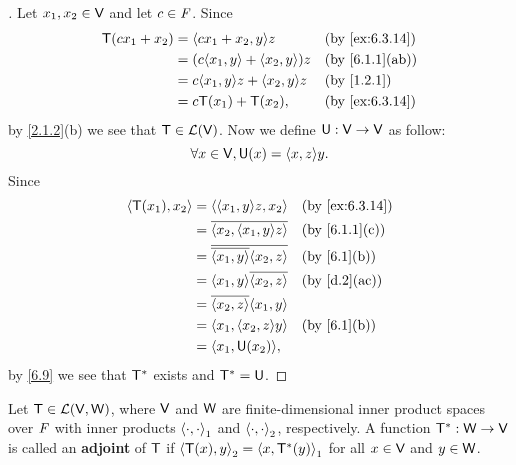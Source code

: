 \begin{proof}[]
	Let \(x_1, x_2 \in \mathsf{V}\) and let \(c \in \mathit{F}\).
	Since
	\begin{align*}
		\T(c x_1 + x_2) & = \inn{c x_1 + x_2, y} z            &  & \by{ex:6.3.14} \\
		                & = (c \inn{x_1, y} + \inn{x_2, y}) z &  & \by{6.1.1}[ab] \\
		                & = c \inn{x_1, y} z + \inn{x_2, y} z &  & \by{1.2.1}     \\
		                & = c \T(x_1) + \T(x_2),              &  & \by{ex:6.3.14}
	\end{align*}
	by \cref{2.1.2}(b) we see that \(\mathsf{T} \in \mathcal{L}(\mathsf{V})\).
	Now we define \(\mathsf{U} : \mathsf{V} \to \mathsf{V}\) as follow:
	\[
		\forall x \in \V, \U(x) = \inn{x, z} y.
	\]
	Since
	\begin{align*}
		\inn{\T(x_1), x_2} & = \inn{\inn{x_1, y} z, x_2}               &  & \by{ex:6.3.14} \\
		                   & = \conj{\inn{x_2, \inn{x_1, y} z}}        &  & \by{6.1.1}[c]  \\
		                   & = \conj{\conj{\inn{x_1, y}} \inn{x_2, z}} &  & \by{6.1}[b]    \\
		                   & = \inn{x_1, y} \conj{\inn{x_2, z}}        &  & \by{d.2}[ac]   \\
		                   & = \conj{\inn{x_2, z}} \inn{x_1, y}                            \\
		                   & = \inn{x_1, \inn{x_2, z} y}               &  & \by{6.1}[b]    \\
		                   & = \inn{x_1, \U(x_2)},
	\end{align*}
	by \cref{6.9} we see that \(\mathsf{T}^*\) exists and \(\mathsf{T}^* = \mathsf{U}\).
\end{proof}

\begin{defn}\label{6.3.8}
	Let \(\mathsf{T} \in \mathcal{L}(\mathsf{V}, \mathsf{W})\), where \(\mathsf{V}\) and \(\mathsf{W}\) are finite-dimensional inner product spaces over \(\mathit{F}\) with inner products \(\left\langle\cdot, \cdot\right\rangle_1\) and \(\left\langle\cdot, \cdot\right\rangle_2\), respectively.
	A function \(\mathsf{T}^* : \mathsf{W} \to \mathsf{V}\) is called an \textbf{adjoint} of \(\mathsf{T}\) if \(\left\langle\mathsf{T}(x), y\right\rangle_2 = \left\langle x, \mathsf{T}^*(y)\right\rangle_1\) for all \(x \in \mathsf{V}\) and \(y \in \mathsf{W}\).
\end{defn}

